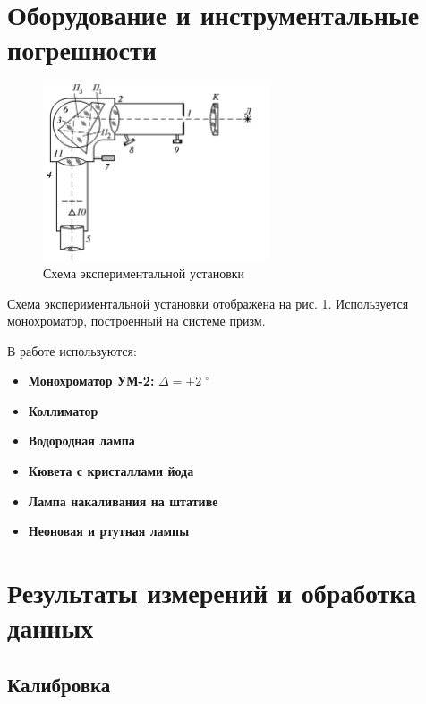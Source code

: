 \documentclass[a4paper]{article}
\newcommand{\Equip}[3]{
	
	\item{\bf #1:} $\Delta = \pm #2\; #3$}
\newcommand{\equip}[1]{
	
	\item{\bf #1}}
\begin{document}
		
	\section{Оборудование и инструментальные погрешности}
	
	\begin{figure}[hb]
		\centering
		\includegraphics[width=0.6\textwidth]{Screenshot_2}
		\caption{Схема экспериментальной установки}
		\label{fig:screenshot2}
	\end{figure}
	
	
	Схема экспериментальной установки отображена на рис. \ref{fig:screenshot2}. Используется монохроматор, построенный на системе призм.
		
	В работе используются:
	\begin{itemize}
		\Equip{Монохроматор УМ-2}{2}{^\circ}
		\equip{Коллиматор}
		\equip{Водородная лампа}
		\equip{Кювета с кристаллами йода}
		\equip{Лампа накаливания на штативе}
		\equip{Неоновая и ртутная лампы}
	\end{itemize}
	
	\section{Результаты измерений и обработка данных}
	
	\subsection{Калибровка}
	
\end{document}
